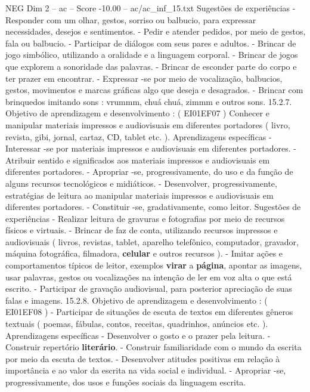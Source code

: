 \begin{textsample}{NEG Dim 2 – ac – Score -10.00 – ac/ac\_inf\_15.txt}
Sugestões de experiências - Responder com um olhar, gestos, sorriso ou balbucio, para expressar necessidades, desejos e sentimentos. - Pedir e atender pedidos, por meio de gestos, fala ou balbucio. - Participar de diálogos com seus pares e adultos. - Brincar de jogo simbólico, utilizando a oralidade e a linguagem corporal. - Brincar de jogos que explorem a sonoridade das palavras. - Brincar de esconder parte do corpo e ter prazer em encontrar. - Expressar -se por meio de vocalização, balbucios, gestos, movimentos e marcas gráficas algo que deseja e desagrados. - Brincar com brinquedos imitando sons : vrummm, chuá chuá, zimmm e outros sons. 15.2.7.
Objetivo de aprendizagem e desenvolvimento : ( EI01EF07 ) Conhecer e manipular materiais impressos e audiovisuais em diferentes portadores ( livro, revista, gibi, jornal, cartaz, CD, tablet etc. ).
Aprendizagens específicas - Interessar -se por materiais impressos e audiovisuais em diferentes portadores. - Atribuir sentido e significados aos materiais impressos e audiovisuais em diferentes portadores. - Apropriar -se, progressivamente, do uso e da função de alguns recursos tecnológicos e midiáticos. - Desenvolver, progressivamente, estratégias de leitura ao manipular materiais impressos e audiovisuais em diferentes portadores. - Constituir -se, gradativamente, como leitor.
Sugestões de experiências - Realizar leitura de gravuras e fotografias por meio de recursos físicos e virtuais. - Brincar de faz de conta, utilizando recursos impressos e audiovisuais ( livros, revistas, tablet, aparelho telefônico, computador, gravador, máquina fotográfica, filmadora, \textbf{celular} e outros recursos ). - Imitar ações e comportamentos típicos de leitor, exemplos \textbf{virar} a \textbf{página}, apontar as imagens, usar palavras, gestos ou vocalizações na intenção de ler em voz alta o que está escrito. - Participar de gravação audiovisual, para posterior apreciação de suas falas e imagens. 15.2.8.
Objetivo de aprendizagem e desenvolvimento : ( EI01EF08 ) - Participar de situações de escuta de textos em diferentes gêneros textuais ( poemas, fábulas, contos, receitas, quadrinhos, anúncios etc. ).
Aprendizagens específicas - Desenvolver o gosto e o prazer pela leitura. - Construir repertório \textbf{literário}. - Construir familiaridade com o mundo da escrita por meio da escuta de textos. - Desenvolver atitudes positivas em relação à importância e ao valor da escrita na vida social e individual. - Apropriar -se, progressivamente, dos usos e funções sociais da linguagem escrita.

\end{textsample}
